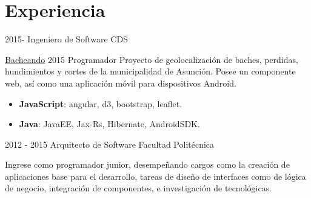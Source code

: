 \documentclass[]{friggeri-cv}
\begin{document}
\section{Experiencia}
\begin{entrylist}
\entry
    {2015-}
    {Ingeniero de Software}
    {CDS}
    {\proyecto
        {\href{http://bacheando.com/}{Bacheando}}
        {2015}
        {Programador}
        {Proyecto de geolocalización de baches, perdidas, hundimientos y
            cortes de la municipalidad de Asunción.
            Posee un componente web, así como una aplicación móvil para
            dispositivos Android.}
        {\begin{itemize}
            \item \textbf{JavaScript}: angular, d3, bootstrap, leaflet.
            \item \textbf{Java}: JavaEE, Jax-Rs, Hibernate, AndroidSDK.
        \end{itemize}} }

\entry
    {2012 - 2015}
    {Arquitecto de Software}
    {Facultad Politécnica}
    {Ingrese como programador junior, desempeñando cargos como la creación de
        aplicaciones base para el desarrollo, tareas de diseño de interfaces
        como de lógica de negocio, integración de componentes, e investigación
        de tecnológicas.

}
\end{entrylist}
\end{document}

